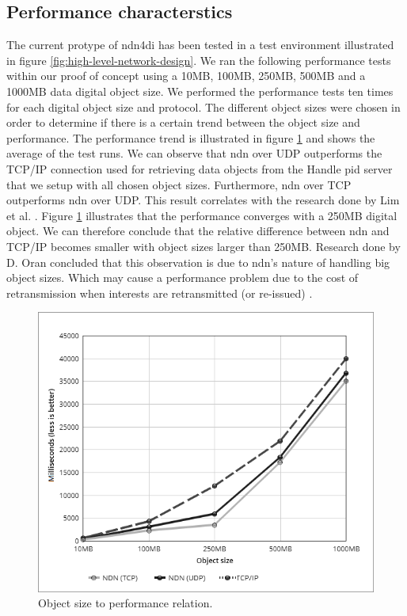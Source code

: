 \documentclass[conference]{IEEEtran}
\begin{document}

\subsection{Performance characterstics}
The current protype of \gls{ndn4di} has been tested in a test environment illustrated in figure \ref{fig:high-level-network-design}. We ran the following performance tests within our proof of concept using a 10MB, 100MB, 250MB, 500MB and a 1000MB data digital object size. We performed the performance tests ten times for each digital object size and protocol. The different object sizes were chosen in order to determine if there is a certain trend between the object size and performance. The performance trend is illustrated in figure \ref{fig:perftest-6} and shows the average of the test runs. We can observe that \gls{ndn} over UDP outperforms the TCP/IP connection used for retrieving data objects from the Handle \gls{pid} server that we setup with all chosen object sizes. Furthermore, \gls{ndn} over TCP outperforms \gls{ndn} over UDP. This result correlates with the research done by Lim et al. \cite{lim2018ndn}. Figure \ref{fig:perftest-6} illustrates that the performance converges with a 250MB digital object. We can therefore conclude that the relative difference between \gls{ndn} and TCP/IP becomes smaller with object sizes larger than 250MB. Research done by D. Oran concluded that this observation is due to \gls{ndn}'s nature of handling big object sizes. Which may cause a performance problem due to the cost of retransmission when interests are retransmitted (or re-issued) \cite{ndn-objects}.

\begin{figure}[H]
\centering
\includegraphics[width=\columnwidth]{images/linechart5.png}
\caption{Object size to performance relation.}
\label{fig:perftest-6}
\end{figure}
\end{document}
